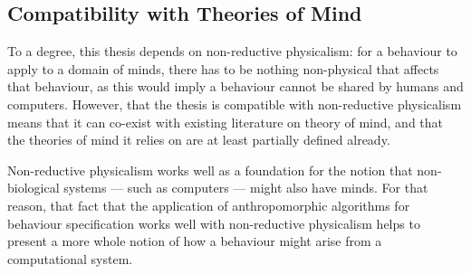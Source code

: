 \subsection{Compatibility with Theories of Mind}
To a degree, this thesis depends on non-reductive physicalism: for a behaviour to apply to a domain of minds, there has to be nothing non-physical that affects that behaviour, as this would imply a behaviour cannot be shared by humans and computers. However, that the thesis is compatible with non-reductive physicalism means that it can co-exist with existing literature on theory of mind, and that the theories of mind it relies on are at least partially defined already.\par

Non-reductive physicalism works well as a foundation for the notion that non-biological systems --- such as computers --- might also have minds. For that reason, that fact that the application of anthropomorphic algorithms for behaviour specification works well with non-reductive physicalism helps to present a more whole notion of how a behaviour might arise from a computational system.\par
